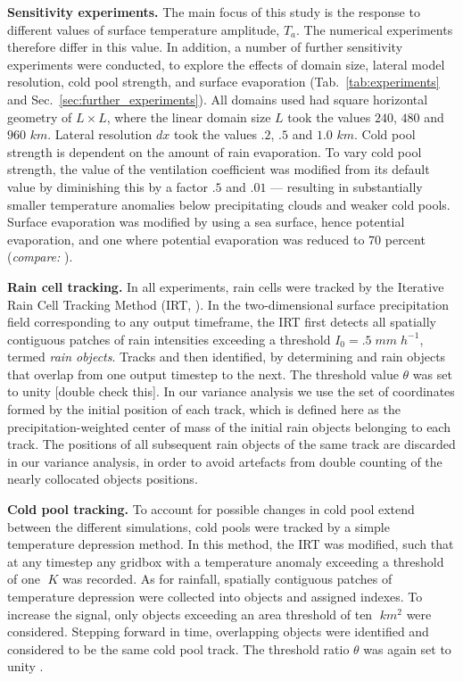 \documentclass[draft,linenumbers]{agujournal2019}
\begin{document}
\noindent
{\bf Sensitivity experiments.} 
The main focus of this study is the response to different values of surface temperature amplitude, $T_a$. 
The numerical experiments therefore differ in this value.
In addition, a number of further sensitivity experiments were conducted, to explore the effects of domain size, lateral model resolution, cold pool strength, and surface evaporation (Tab.~\ref{tab:experiments} and Sec.~\ref{sec:further_experiments}).
All domains used had square horizontal geometry of $L\times L$, where the linear domain size $L$ took the values $240$, $480$ and $960$ $km$.
Lateral resolution $dx$ took the values $.2$, $.5$ and $1.0$ $km$.
Cold pool strength is dependent on the amount of rain evaporation. To vary cold pool strength, the value of the ventilation coefficient was modified from its default value \cite{seifert2006two} by diminishing this by a factor $.5$ and $.01$ --- resulting in substantially smaller temperature anomalies below precipitating clouds and weaker cold pools.
Surface evaporation was modified by using a sea surface, hence potential evaporation, and one where potential evaporation was reduced to 70 percent ({\it compare:} \cite{moseley2016}).

\noindent
{\bf Rain cell tracking.}
In all experiments, rain cells were tracked by the Iterative Rain Cell Tracking Method (IRT, \cite{moseley2019statistical}).
In the two-dimensional surface precipitation field corresponding to any output timeframe, the IRT first detects all spatially contiguous patches of rain intensities exceeding a threshold $I_0=.5\;mm\;h^{-1}$, termed {\it rain objects}.
Tracks and then identified, by determining and rain objects that overlap from one output timestep to the next. 
The threshold value $\theta$ was set to unity [double check this].
In our variance analysis we use the set of coordinates formed by the initial position of each track, which is defined here as the precipitation-weighted center of mass of the initial rain objects belonging to each track.
The positions of all subsequent rain objects of the same track are discarded in our variance analysis, in order to avoid artefacts from double counting of the nearly collocated objects positions.

\noindent
{\bf Cold pool tracking.}
To account for possible changes in cold pool extend between the different simulations, cold pools were tracked by a simple temperature depression method.
In this method, the IRT was modified, such that at any timestep any gridbox with a temperature anomaly exceeding a threshold of one $\;K$ was recorded.
As for rainfall, spatially contiguous patches of temperature depression were collected into objects and assigned indexes.
To increase the signal, only objects exceeding an area threshold of ten $\;km^2$ were considered.
Stepping forward in time, overlapping objects were identified and considered to be the same cold pool track.
The threshold ratio $\theta$ was again set to unity \cite{moseley2019statistical}.
\end{document}
